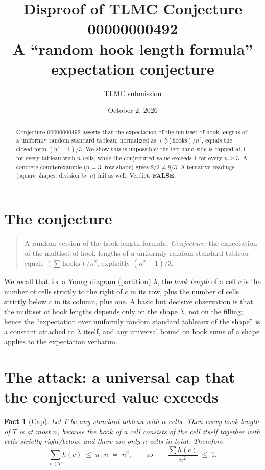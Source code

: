 \documentclass[11pt]{article}
\title{Disproof of TLMC Conjecture 00000000492\\
\large A ``random hook length formula'' expectation conjecture}
\author{TLMC submission}
\date{October 2, 2026}
\newtheorem{fact}{Fact}
\begin{document}
\maketitle

\begin{abstract}
Conjecture 00000000492 asserts that the expectation of the multiset of hook
lengths of a uniformly random standard tableau, normalized as $(\sum
\mathrm{hooks})/n^2$, equals the closed form $(n^2-1)/3$. We show this is
impossible: the left-hand side is capped at $1$ for every tableau with $n$ cells,
while the conjectured value exceeds $1$ for every $n \ge 3$. A concrete
counterexample ($n=3$, row shape) gives $2/3 \ne 8/3$. Alternative readings
(square shapes, division by $n$) fail as well. Verdict: \textbf{FALSE}.
\end{abstract}

\section{The conjecture}

\begin{quote}
A random version of the hook length formula. \emph{Conjecture:} the expectation
of the multiset of hook lengths of a uniformly random standard tableau equals
$(\sum \mathrm{hooks})/n^2$, explicitly $(n^2-1)/3$.
\end{quote}

We recall that for a Young diagram (partition) $\lambda$, the \emph{hook length}
of a cell $c$ is the number of cells strictly to the right of $c$ in its row,
plus the number of cells strictly below $c$ in its column, plus one. A basic but
decisive observation is that the multiset of hook lengths depends only on the
shape $\lambda$, not on the filling; hence the ``expectation over uniformly
random standard tableaux of the shape'' is a constant attached to $\lambda$
itself, and any universal bound on hook sums of a shape applies to the
expectation verbatim.

\section{The attack: a universal cap that the conjectured value exceeds}

\begin{fact}[Cap]\label{fact:cap}
Let $T$ be any standard tableau with $n$ cells. Then every hook length of $T$ is
at most $n$, because the hook of a cell consists of the cell itself together
with cells strictly right/below, and there are only $n$ cells in total.
Therefore
\[
\sum_{c \in T} h(c) \;\le\; n \cdot n \;=\; n^2,
\qquad\text{so}\qquad
\frac{\sum h(c)}{n^2} \;\le\; 1 .
\]
\end{fact}
\end{document}
